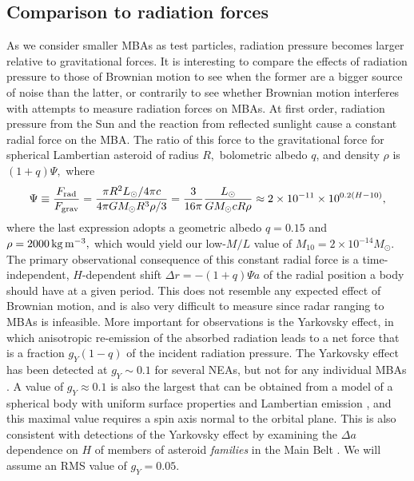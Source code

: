 \documentclass[linenumbers, onecolumn]{aastex631}
\newcommand{\eg}{\textit{e.g.\/}}
\newcommand\edited[1]{{\color{red} {#1}}}
\begin{document}
\subsection{Comparison to radiation forces}
As we consider smaller MBAs as test particles, radiation pressure becomes larger relative to gravitational forces.  It is interesting to compare the effects of radiation pressure to those of Brownian motion to see when the former are a bigger source of noise than the latter, or contrarily to see whether Brownian motion interferes with attempts to measure radiation forces on MBAs.  At first order, radiation pressure from the Sun and the reaction from reflected sunlight cause a constant radial force on the MBA.  The ratio of this force to the gravitational force for spherical Lambertian asteroid of radius $R,$ bolometric albedo $q$, and density $\rho$ is $(1+q)\Psi,$ where
\edited{
\begin{equation}
 \Psi \equiv \frac{F_{\rm rad}}{F_{\rm grav}} = \frac{\pi R^2 L_\odot/4\pi c}{4\pi GM_\odot R^3\rho/3}
   = \frac{3}{16\pi} \frac{L_\odot}{GM_\odot c R \rho} \approx
   2\times10^{-11} \times 10^{0.2(H-10)},
 \end{equation}
 }
where the last expression adopts \edited{a geometric albedo $q=0.15$ and 
$\rho=2000\,{\rm kg}\, {\rm m}^{-3},$ which would yield our low-$M/L$ value of $M_{10}=2\times10^{-14}M_\odot.$}
The primary observational consequence of
this constant radial force is a time-independent, $H$-dependent 
shift $\Delta r = -(1+q)\Psi a$ of the radial position a body should
have at a given period.  
This does not resemble
any expected effect of Brownian motion, and is also very difficult to
measure since radar ranging to MBAs is infeasible.  More important for
observations is the
Yarkovsky effect, in which anisotropic re-emission of the absorbed
radiation leads to a net force that is a fraction $g_Y(1-q)$ of the
incident radiation pressure.  The Yarkovsky effect has been detected
at $g_Y\sim0.1$ for several NEAs, but not for any individual MBAs
\citep[Yarkovsky effect and data are review by][]{yarkovsky}.
A value of $g_Y\approx0.1$ is also the largest that can be obtained
  from a model of a spherical body with uniform surface properties and
  Lambertian emission \citep{tremaine}, \edited{and this maximal value requires a spin axis
  normal to the orbital plane.} This is also consistent with detections of  the
Yarkovsky effect by examining the $\Delta a$ dependence on $H$ of
members of asteroid \emph{families} in the Main Belt
\citep[\eg][]{karin}.  We will assume an RMS value of $g_Y=0.05.$
\end{document}
